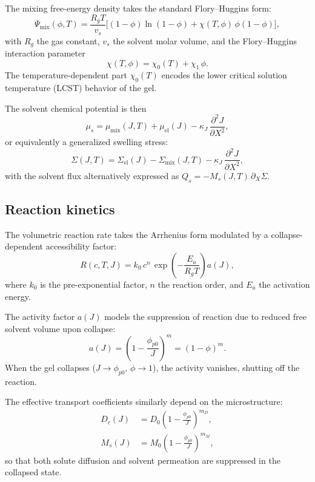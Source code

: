 \documentclass[aps,pre,reprint,superscriptaddress,longbibliography,floatfix]{revtex4-2}
\newcommand{\pp}{\phi_{p0}}
\begin{document}
The mixing free-energy density takes the standard Flory--Huggins form:
\begin{equation}
  \Psi_\mathrm{mix}(\phi,T)
  = \frac{R_g T}{v_s}
  \Big[(1-\phi)\ln(1-\phi) + \chi(T,\phi)\,\phi(1-\phi)\Big],
  \label{eq:Psi_mix}
\end{equation}
with $R_g$ the gas constant, $v_s$ the solvent molar volume, and the Flory--Huggins interaction parameter
\begin{equation}
  \chi(T,\phi) = \chi_0(T) + \chi_1\,\phi.
  \label{eq:chi}
\end{equation}
The temperature-dependent part $\chi_0(T)$ encodes the lower critical solution temperature (LCST) behavior of the gel.

The solvent chemical potential is then
\begin{equation}
  \mu_s = \mu_\mathrm{mix}(J,T) + \mu_\mathrm{el}(J)
  - \kappa_J\,\frac{\partial^2 J}{\partial X^2},
  \label{eq:mu_s}
\end{equation}
or equivalently a generalized swelling stress:
\begin{equation}
  \Sigma(J,T) = \Sigma_\mathrm{el}(J) - \Sigma_\mathrm{mix}(J,T)
  - \kappa_J\,\frac{\partial^2 J}{\partial X^2},
  \label{eq:Sigma}
\end{equation}
with the solvent flux alternatively expressed as $Q_s = -M_s(J,T)\,\partial_X \Sigma$.

\subsection{Reaction kinetics}

The volumetric reaction rate takes the Arrhenius form modulated by a collapse-dependent accessibility factor:
\begin{equation}
  R(c,T,J) = k_0\,c^n\,\exp\!\left(-\frac{E_a}{R_g T}\right) a(J),
  \label{eq:R}
\end{equation}
where $k_0$ is the pre-exponential factor, $n$ the reaction order, and $E_a$ the activation energy.

The activity factor $a(J)$ models the suppression of reaction due to reduced free solvent volume upon collapse:
\begin{equation}
  a(J) = \left(1 - \frac{\pp}{J}\right)^m = (1-\phi)^m.
  \label{eq:aJ}
\end{equation}
When the gel collapses ($J\to\pp$, $\phi\to 1$), the activity vanishes, shutting off the reaction.

The effective transport coefficients similarly depend on the microstructure:
\begin{align}
  D_c(J) &= D_0\left(1-\frac{\pp}{J}\right)^{m_D}, \label{eq:Dc} \\
  M_s(J) &= M_0\left(1-\frac{\pp}{J}\right)^{m_M}, \label{eq:Ms}
\end{align}
so that both solute diffusion and solvent permeation are suppressed in the collapsed state.
\end{document}
